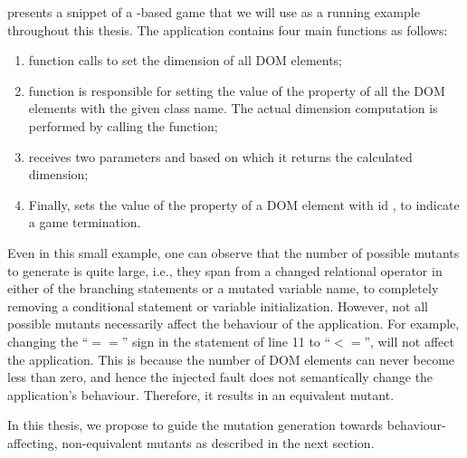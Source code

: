  presents a snippet of a \javascript-based game that we will use as a running example throughout this thesis. 
The application contains four main functions as follows:

\begin{enumerate}
\item {} function calls  to set the dimension of all  DOM elements;
\item {} function is responsible for setting the  value of the  property of all the DOM elements with the given class name. The actual dimension computation is performed by calling the  function;
\item {} receives two parameters  and  based on which it returns the calculated dimension; %
\item Finally,  sets the  value of the  property of a DOM element with id , to indicate a game termination.
\end{enumerate}

Even in this small example, one can observe that the number of possible mutants to generate is quite large, i.e., they span from a changed relational operator in either of
the branching statements or a mutated variable name, to completely removing a conditional statement or variable initialization.
However, not all possible mutants necessarily affect the behaviour of the application. 
For example, changing the ``$==$'' sign
in the  statement of line 11 to  ``$<=$'', will not affect the application.
This is because the number of DOM elements can never
become less than zero,
and hence the injected fault does not semantically change the application's behaviour.  
Therefore, it results in an equivalent mutant. 

In this thesis, we propose to guide the mutation generation towards behaviour-affecting,
non-equivalent mutants as described in the next section. %